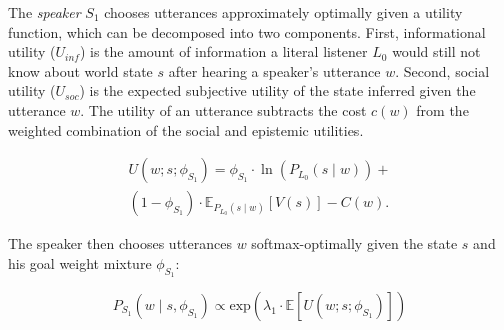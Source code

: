 \documentclass[9pt,twocolumn,twoside,lineno]{main_class_file}
\begin{document}
{The \emph{speaker} $S_1$ chooses utterances approximately optimally given a utility function, which can be decomposed into two components. 
First, informational utility ($U_{inf}$) is the amount of information a literal listener $L_0$ would still not know about world state $s$ after hearing a speaker's utterance $w$. 
Second, social utility ($U_{soc}$) is the expected subjective utility of the state inferred given the utterance $w$. 
The utility of an utterance subtracts the cost $c(w)$ from the weighted combination of the social and epistemic utilities. 

\begin{equation}
\begin{split}
U(w; s; \phi_{S_1}) = \phi_{S_1} \cdot \ln(P_{L_0}(s \mid w)) + \\ (1 - \phi_{S_1}) \cdot \mathbb{E}_{P_{L_0}(s \mid w)}[V(s)] - C(w).
\end{split}
\end{equation}

\noindent The speaker then chooses utterances $w$ softmax-optimally given the state $s$ and his goal weight mixture $\phi_{S_1}$: 

\begin{equation} 
P_{S_1}(w \mid s, \phi_{S_1}) \propto \mathrm{exp}(\lambda_{1} \cdot \mathbb{E}[U(w; s; \phi_{S_1})])
\end{equation}

%
%
%
%
%
%
%
%


}
\end{document}
